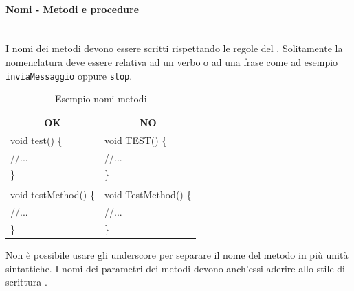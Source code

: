 \paragraph{Nomi - Metodi e procedure}\mbox{}\\[0.4cm]
I nomi dei metodi devono essere scritti rispettando le regole del . Solitamente la nomenclatura deve essere relativa ad un verbo o ad una frase come ad esempio \texttt{inviaMessaggio} oppure \texttt{stop}.
\begin{table} [H]
	\begin{center}
		\begin{tabular}{ | l | l |}
			\multicolumn{1}{c}{\textbf{OK}}&\multicolumn{1}{c}{\textbf{NO}}\\ 
			\hline
			void test() \{& void TEST() \{\\
			\hspace{0.5cm} //... & \hspace{0.5cm} //...\\
			\}&\}\\
			&\\
			void testMethod() \{ & void TestMethod() \{ \\
			\hspace{0.5cm} //... & \hspace{0.5cm} //... \\
			\}&\}\\
			\hline
		\end{tabular}
	\end{center}
	\caption{Esempio nomi metodi}
\end{table}
Non è possibile usare gli underscore per separare il nome del metodo in più unità sintattiche. I nomi dei parametri dei metodi devono anch’essi aderire allo stile di scrittura .
